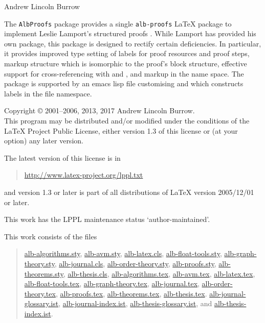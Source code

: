 \documentclass[11pt,a4paper,oneside,titlepage]{alb-latex}
\begin{document}



\begin{albTitlePage}


  Andrew Lincoln Burrow


  The \texttt{AlbProofs} package provides a single \texttt{alb-proofs}
  \LaTeX{} package to implement Leslie Lamport's structured proofs
  \citep{lamport93:_how_write_proof}.  While Lamport has provided his
  own package, this package is designed to rectify certain deficiencies.
  In particular, it provides improved type setting of labels for proof
  resources and proof steps, markup structure which is isomorphic to the
  proof's block structure, effective support for cross-referencing with
  \AUCTeX{} and \RefTeX{}, and markup in the \albLogo{} name space.  The
  package is supported by an emacs lisp file customising \AUCTeX{} and
  \RefTeX{} which constructs labels in the file namespace.



  Copyright \copyright{} 2001--2006, 2013, 2017 Andrew Lincoln Burrow.\\
  This program may be distributed and/or modified under the conditions
  of the \LaTeX{} Project Public License, either version 1.3 of this
  license or (at your option) any later version.

  \medskip{}

  The latest version of this license is in
  \begin{quote}
    \url{http://www.latex-project.org/lppl.txt}
  \end{quote}
  and version 1.3 or later is part of all distributions of LaTeX version
  2005/12/01 or later.

  \medskip{}

  This work has the LPPL maintenance status `author-maintained'.

  \medskip{}

  This work consists of the files
  \begin{quote}
    \begin{flushleft}
      \url{alb-algorithms.sty}, \url{alb-avm.sty}, \url{alb-latex.cls},
      \url{alb-float-tools.sty}, \url{alb-graph-theory.sty},
      \url{alb-journal.cls}, \url{alb-order-theory.sty},
      \url{alb-proofs.sty}, \url{alb-theorems.sty},
      \url{alb-thesis.cls}, \url{alb-algorithms.tex}, \url{alb-avm.tex},
      \url{alb-latex.tex}, \url{alb-float-tools.tex},
      \url{alb-graph-theory.tex}, \url{alb-journal.tex},
      \url{alb-order-theory.tex}, \url{alb-proofs.tex},
      \url{alb-theorems.tex}, \url{alb-thesis.tex}.
      \url{alb-journal-glossary.ist}, \url{alb-journal-index.ist},
      \url{alb-thesis-glossary.ist}, and \url{alb-thesis-index.ist}.
    \end{flushleft}
  \end{quote}



\end{albTitlePage}
\end{document}
